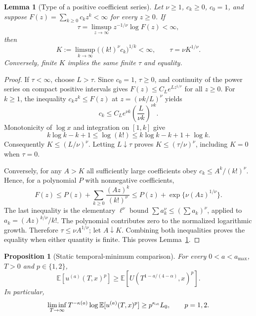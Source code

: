 \documentclass[12pt]{article}
\numberwithin{equation}{section}
\newtheorem{lemma}[theorem]{Lemma}
\newtheorem{proposition}[theorem]{Proposition}
\theoremstyle{definition}
\newcommand{\E}{\mathbb{E}}
\begin{document}
\begin{lemma}[Type of a positive coefficient series]\label{L:positive-series-type}
  Let $\nu\ge1$, $c_k\ge0$, $c_0=1$, and suppose
  $F(z)=\sum_{k\ge0}c_kz^k<\infty$ for every $z\ge0$. If
  \[
    \tau=\limsup_{z\to\infty}z^{-1/\nu}\log F(z)<\infty,
  \]
  then
  \begin{equation}\label{E:positive-series-type}
    K:=\limsup_{k\to\infty}\big((k!)^\nu c_k\big)^{1/k}<\infty,
    \qquad \tau=\nu K^{1/\nu}.
  \end{equation}
  Conversely, finite $K$ implies the same finite $\tau$ and equality.
\end{lemma}

\begin{proof}
  If $\tau<\infty$, choose $L>\tau$. Since $c_0=1$, $\tau\ge0$,
  and continuity of the power series on compact positive intervals gives
  $F(z)\le C_L e^{Lz^{1/\nu}}$ for all $z\ge0$.
  For $k\ge1$, the inequality $c_kz^k\le F(z)$ at
  $z=(\nu k/L)^\nu$ yields
  \[
    c_k\le C_L e^{\nu k}\left(\frac L{\nu k}\right)^{\nu k}.
  \]
  Monotonicity of $\log x$ and integration on $[1,k]$ give
  \[
    k\log k-k+1\le\log(k!)
    \le k\log k-k+1+\log k.
  \]
  Consequently $K\le(L/\nu)^\nu$. Letting $L\downarrow\tau$ proves
  $K\le(\tau/\nu)^\nu$, including $K=0$ when $\tau=0$.

  Conversely, for any $A>K$ all sufficiently large coefficients obey
  $c_k\le A^k/(k!)^\nu$. Hence, for a polynomial $P$ with nonnegative
  coefficients,
  \[
    F(z)\le P(z)+\sum_{k\ge0}\frac{(Az)^k}{(k!)^\nu}
    \le P(z)+\exp\{\nu(Az)^{1/\nu}\}.
  \]
  The last inequality is the elementary $\ell^\nu$ bound
  $\sum a_k^\nu\le(\sum a_k)^\nu$, applied to
  $a_k=(Az)^{k/\nu}/k!$. The polynomial contributes zero to the
  normalized logarithmic growth. Therefore $\tau\le\nu A^{1/\nu}$;
  let $A\downarrow K$. Combining both inequalities proves the equality
  when either quantity is finite. This proves Lemma~\ref{L:positive-series-type}.
\end{proof}

\begin{proposition}[Static temporal-minimum comparison]\label{P:static-minorant-lower}
  For every $0<a<a_{\max}$, $T>0$ and $p\in\{1,2\}$,
  \begin{equation}\label{E:static-minorant-moment}
    \E[u^{(a)}(T,x)^p]
    \ge\E\left[U\left(T^{1-a/(4-\alpha)},x\right)^p\right].
  \end{equation}
  In particular,
  \begin{equation}\label{E:static-minorant-rate}
    \liminf_{T\to\infty}T^{-\kappa(a)}\log\E[u^{(a)}(T,x)^p]
    \ge p^{\kappa_{\rm st}}L_0,\qquad p=1,2.
  \end{equation}
\end{proposition}
\end{document}

